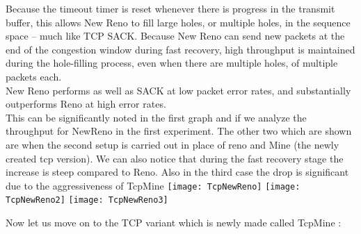 \documentclass[solution,addpoints,12pt]{exam}
\begin{document}
Because the timeout timer is reset whenever there is progress in the transmit buffer, this allows New Reno to fill large holes, or multiple holes, in the sequence space – much like TCP SACK. Because New Reno can send new packets at the end of the congestion window during fast recovery, high throughput is maintained during the hole-filling process, even when there are multiple holes, of multiple packets each.\\

New Reno performs as well as SACK at low packet error rates, and substantially outperforms Reno at high error rates.\\

This can be significantly noted in the first graph and if
we analyze the throughput for NewReno in the first experiment.
The other two which are shown are when the second setup is carried
out in place of reno and Mine (the newly created tcp version).
We can also notice that during the fast recovery stage the
increase is steep compared to Reno. Also in the third case the drop
is significant due to the aggressiveness of TcpMine
\newpage
\texttt{[image: TcpNewReno]}
\newpage
\texttt{[image: TcpNewReno2]}
\newpage
\texttt{[image: TcpNewReno3]}

Now let us move on to the TCP variant which is newly made called
TcpMine :\\
\end{document}
